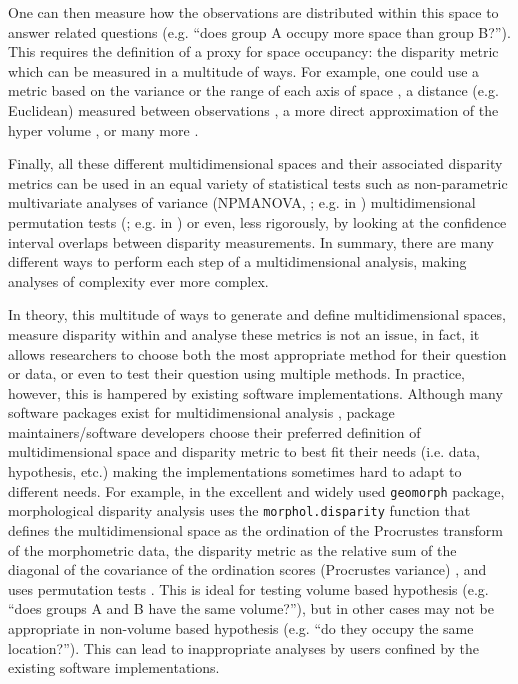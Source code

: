 \documentclass[12pt,letterpaper]{article}
\begin{document}
One can then measure how the observations are distributed within this space to answer related questions (e.g. ``does group A occupy more space than group B?'').
This requires the definition of a proxy for space occupancy: the disparity metric \citep[or index;][]{Hopkins2017} which can be measured in a multitude of ways.
For example, one could use a metric based on the variance or the range of each axis of space \citep{Wills2001, Ciampaglio2001}, a distance (e.g. Euclidean) measured between observations \citep{foote1993contributions,Foote29111996}, a more direct approximation of the hyper volume \citep{cornwell2006trait,DonohueDim}, or many more \citep[e.g.][]{navarro2003MDA}.

Finally, all these different multidimensional spaces and their associated disparity metrics can be used in an equal variety of statistical tests such as non-parametric multivariate analyses of variance (NPMANOVA, \citealt{NPMANOVA}; e.g. in \citealt{Brusatte12092008}) multidimensional permutation tests (\citealt{ManlyPermutations}; e.g. in \citealt{diaz2016global}) or even, less rigorously, by looking at the confidence interval overlaps between disparity measurements.
In summary, there are many different ways to perform each step of a multidimensional analysis, making analyses of complexity ever more complex.

In theory, this multitude of ways to generate and define multidimensional spaces, measure disparity within and analyse these metrics is not an issue, in fact, it allows researchers to choose both the most appropriate method for their question or data, or even to test their question using multiple methods.
In practice, however, this is hampered by existing software implementations.
Although many software packages exist for multidimensional analysis \citep[e.g.][]{navarro2003MDA,bouxin2005ginkgo,de2007ginkgo,oksanen2007vegan,geiger2008,adams2013geomorph,Claddis,adams2017geometric},
package maintainers/software developers choose their preferred definition of multidimensional space and disparity metric to best fit their needs (i.e. data, hypothesis, etc.) making the implementations sometimes hard to adapt to different needs.
For example, in the excellent and widely used \texttt{geomorph} package, morphological disparity analysis uses the \texttt{morphol.disparity} function that defines the multidimensional space as the ordination of the Procrustes transform of the morphometric data, the disparity metric
as the relative sum of the diagonal of the covariance of the ordination scores (Procrustes variance)
, and uses permutation tests \citep{zelditch2012geometric,adams2013geomorph,adams2017geometric}.
This is ideal for testing volume based hypothesis (e.g. ``does groups A and B have the same volume?''), but in other cases may not be appropriate in non-volume based hypothesis (e.g. ``do they occupy the same location?'').
This can lead to inappropriate analyses by users confined by the existing software implementations.
\end{document}
